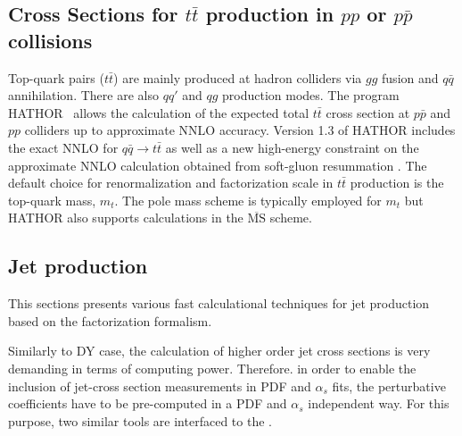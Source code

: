 \subsection{Cross Sections for \texorpdfstring{$t\bar{t}$}{t-tbar} production in $pp$ or $p\bar p$ collisions}
%
Top-quark pairs ($t\bar{t}$) are mainly produced at hadron colliders via $gg$ fusion and
$q \bar q$ annihilation. There are also $q q'$ and
$q g$ production modes.
The program HATHOR~\cite{Aliev:2010zk} allows the calculation of 
the expected total $t \bar t$ cross section at 
$p \bar p$ and $p p$ colliders up to approximate NNLO accuracy.
Version 1.3 of HATHOR includes the exact NNLO for $q \bar q \to t \bar t$ \cite{Baernreuther:2012ws}
as well as a new high-energy constraint on the approximate NNLO calculation obtained from
soft-gluon resummation \cite{Moch:2012mk}.
The default choice for renormalization and factorization scale in $t \bar t$ production is the top-quark mass, $m_t$.
The pole mass scheme is typically employed for $m_t$ but HATHOR also supports calculations in
the $\overline{\text{MS}}$ scheme.

\subsection{Jet production}
This sections presents various fast calculational techniques for jet production based on
the factorization formalism.

Similarly to DY case, the calculation of higher order jet cross sections 
is very demanding in terms of computing power. 
Therefore. in order to enable the inclusion of jet-cross section 
measurements in PDF and $\alpha_s$ fits, the perturbative
coefficients have to be pre-computed in a PDF and $\alpha_s$ 
independent way. For this purpose, two similar tools are
interfaced to the \fitter .

